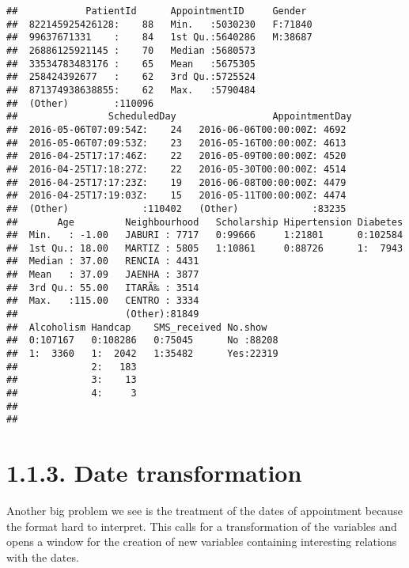\documentclass[]{article}
\begin{document}
\begin{verbatim}
##            PatientId      AppointmentID     Gender   
##  822145925426128:    88   Min.   :5030230   F:71840  
##  99637671331    :    84   1st Qu.:5640286   M:38687  
##  26886125921145 :    70   Median :5680573            
##  33534783483176 :    65   Mean   :5675305            
##  258424392677   :    62   3rd Qu.:5725524            
##  871374938638855:    62   Max.   :5790484            
##  (Other)        :110096                              
##                ScheduledDay                 AppointmentDay 
##  2016-05-06T07:09:54Z:    24   2016-06-06T00:00:00Z: 4692  
##  2016-05-06T07:09:53Z:    23   2016-05-16T00:00:00Z: 4613  
##  2016-04-25T17:17:46Z:    22   2016-05-09T00:00:00Z: 4520  
##  2016-04-25T17:18:27Z:    22   2016-05-30T00:00:00Z: 4514  
##  2016-04-25T17:17:23Z:    19   2016-06-08T00:00:00Z: 4479  
##  2016-04-25T17:19:03Z:    15   2016-05-11T00:00:00Z: 4474  
##  (Other)             :110402   (Other)             :83235  
##       Age         Neighbourhood   Scholarship Hipertension Diabetes  
##  Min.   : -1.00   JABURI : 7717   0:99666     1:21801      0:102584  
##  1st Qu.: 18.00   MARTIZ : 5805   1:10861     0:88726      1:  7943  
##  Median : 37.00   RENCIA : 4431                                      
##  Mean   : 37.09   JAENHA : 3877                                      
##  3rd Qu.: 55.00   ITARÃ‰ : 3514                                      
##  Max.   :115.00   CENTRO : 3334                                      
##                   (Other):81849                                      
##  Alcoholism Handcap    SMS_received No.show    
##  0:107167   0:108286   0:75045      No :88208  
##  1:  3360   1:  2042   1:35482      Yes:22319  
##             2:   183                           
##             3:    13                           
##             4:     3                           
##                                                
## 
\end{verbatim}

\section{1.1.3. Date transformation}\label{date-transformation}

Another big problem we see is the treatment of the dates of appointment
because the format hard to interpret. This calls for a transformation of
the variables and opens a window for the creation of new variables
containing interesting relations with the dates.
\end{document}
